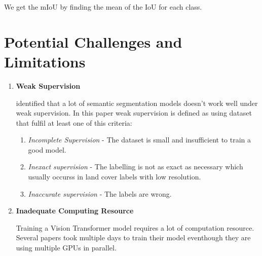 We get the mIoU by finding the mean of the IoU for each class.
\section{Potential Challenges and Limitations}

\begin{enumerate}
    \item \textbf{Weak Supervision}
        
        \cite{weakly-supervised-semantic} identified that a lot of semantic segmentation models doesn't work well under weak supervision. In this paper weak supervision is defined as using dataset that fulfil at least one of this criteria:
\begin{enumerate}
    \item \textit{Incomplete Supervision} - The dataset is small and insufficient to train a good model.
    \item \textit{Inexact supervision} - The labelling is not as exact as necessary which usually occurss in land cover labels with low resolution.
    \item \textit{Inaccurate supervision} - The labels are wrong.
\end{enumerate}
\item \textbf{Inadequate Computing Resource}
    
    Training a Vision Transformer model requires a lot of computation resource. Several papers took multiple days to train their model eventhough they are using multiple GPUs in parallel. 


\end{enumerate}

